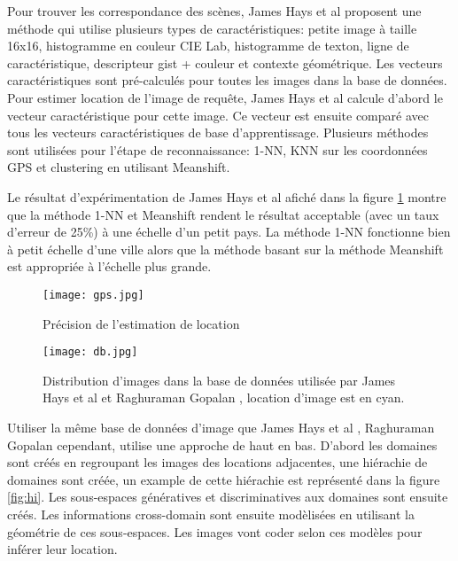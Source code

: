 \documentclass[journal]{IEEEtran}
\begin{document}
Pour trouver les correspondance des scènes, James Hays et al \cite{Hays:2008:im2gps} 
proposent une méthode qui utilise plusieurs types de caractéristiques: petite image à 
taille 16x16, histogramme en couleur CIE Lab, histogramme de texton, ligne de 
caractéristique, descripteur gist + couleur et contexte géométrique. %
Les vecteurs caractéristiques sont pré-calculés pour toutes les images dans la base de 
données. Pour estimer location de l'image de requête, James Hays et al calcule d'abord le 
vecteur caractéristique pour cette image. Ce vecteur est ensuite comparé avec tous les 
vecteurs caractéristiques de base d'apprentissage. Plusieurs méthodes sont utilisées pour 
l'étape de reconnaissance: 1-NN, KNN sur les coordonnées GPS et clustering en utilisant 
Meanshift.

Le résultat d'expérimentation de James Hays et al afiché dans la figure \ref{fig:gps} 
montre que la méthode 1-NN 
et Meanshift rendent le résultat acceptable (avec un taux d'erreur de 25\%) à une échelle 
d'un petit pays. La méthode 1-NN fonctionne bien à petit échelle d'une ville alors que la 
méthode basant sur la méthode Meanshift est appropriée à l'échelle plus grande.
\begin{figure}[t]
    \centering
    \texttt{[image: gps.jpg]}
    \caption{ Précision de l'estimation de location} %
    \label{fig:gps}
\end{figure}

\begin{figure}[t]
    \centering
    \texttt{[image: db.jpg]}
    \caption{ Distribution d'images dans la base de données utilisée par James Hays et al 
\cite{Hays:2008:im2gps} et Raghuraman Gopalan \cite{gopalan2013learning}, location 
d'image est en cyan.}
    \label{fig:db}
\end{figure}

Utiliser la même base de données d'image que James Hays et al \cite{Hays:2008:im2gps}, 
Raghuraman Gopalan \cite{gopalan2013learning} cependant, utilise une approche de haut en 
bas. D'abord les domaines sont créés en regroupant les images des locations adjacentes, 
une hiérachie de domaines sont créée, un example de cette hiérachie est représenté dans 
la figure \ref{fig:hi}.
Les sous-espaces génératives et discriminatives aux domaines sont ensuite créés. Les 
informations cross-domain sont ensuite modèlisées en utilisant la géométrie de ces 
sous-espaces. Les images vont coder selon ces modèles pour inférer leur location. 
\end{document}
